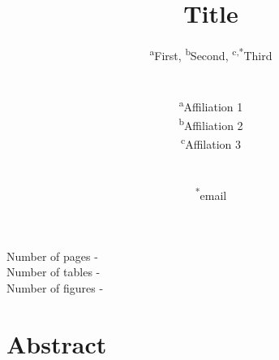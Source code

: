 \documentclass[11pt,a4paper]{article}
\makeatletter
\renewcommand\tableofcontents{%
    \@starttoc{toc}%
}
\makeatother
\begin{document}
\begin{titlepage}
    \title{Title}
    \author{
        \textsuperscript{a}First, 
        \textsuperscript{b}Second,
        \textsuperscript{c,*}Third
        \\ \\ \\
        \textsuperscript{a}Affiliation 1\\
        \textsuperscript{b}Affiliation 2\\
        \textsuperscript{c}Affilation 3
        \\ \\ \\
        \textsuperscript{*}email
    }
\clearpage %
\maketitle
\vspace*{\fill}
\begin{flushright}{
        \noindent Number of pages - \pageref{LastPage} \\
        \noindent Number of tables - \totaltables \\
        \noindent Number of figures - \totalfigures 
}
\end{flushright}
\thispagestyle{empty} %
\end{titlepage}


\thispagestyle{empty} 


\listoftodos[Notes] %


\newpage


\onehalfspacing %


\linenumbers %
\modulolinenumbers[5] %


\thispagestyle{empty} 


\section*{Abstract}






\newpage


\end{document}
